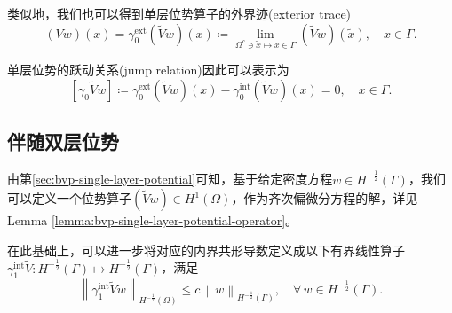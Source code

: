 类似地，我们也可以得到单层位势算子的外界迹(exterior trace)
\begin{equation}
  \label{eq:bvp-single-layer-exterior-trace}
  \left( V w \right)(x) = \gamma_{0}^{\text{ext}} \left( \widetilde{V} w \right)(x) \coloneqq
  \lim_{\Omega^{c} \ni \widetilde{x} \mapsto x \in \Gamma}
  \left( \widetilde{V} w \right) \left( \widetilde{x} \right), \quad x \in \Gamma.
\end{equation}

单层位势的跃动关系(jump relation)因此可以表示为
\begin{equation}
  \label{eq:bvp-single-layer-jump-relaton}
  \left[ \gamma_{0} \widetilde{V} w \right]
  \coloneqq \gamma_{0}^{\text{ext}} \left( \widetilde{V} w \right) (x)
  - \gamma_{0}^{\text{int}} \left( \widetilde{V} w \right)(x) =0, \quad x \in \Gamma.
\end{equation}


\subsection{伴随双层位势}
\label{sec:adjoint-double-layer-potential}
由第\ref{sec:bvp-single-layer-potential}可知，基于给定密度方程$w \in H^{-\frac{1}{2}}(\Gamma)$，我们可以定义一个位势算子$\left( \widetilde{V}w \right) \in H^{1}(\Omega)$，作为齐次偏微分方程的解，详见Lemma \ref{lemma:bvp-single-layer-potential-operator}。

在此基础上，可以进一步将对应的内界共形导数定义成以下有界线性算子$\gamma_{1}^{\text{int}} \widetilde{V}: H^{-\frac{1}{2}}(\Gamma) \mapsto H^{-\frac{1}{2}}(\Gamma)$，满足
\begin{equation*}
  \left\| \gamma_{1}^{\text{int}} \widetilde{V} w \right\|_{H^{-\frac{1}{2}}(\Omega)}
  \le c \,
  \left\| w \right\|_{H^{-\frac{1}{2}}(\Gamma)}, \quad \forall \, w \in H^{-\frac{1}{2}}(\Gamma).
\end{equation*}


